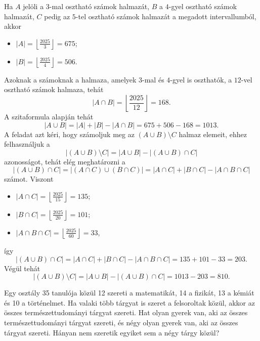 \begin{solution}
Ha $A$ jelöli a $3$-mal osztható számok halmazát, $B$ a $4$-gyel
osztható számok halmazát, $C$ pedig az $5$-tel osztható számok halmazát
a megadott intervallumból, akkor 
\begin{itemize}
\item $|A|=\left\lfloor \frac{2025}{3}\right\rfloor =675$; 
\item $|B|=\left\lfloor \frac{2025}{4}\right\rfloor =506$. 
\end{itemize}
Azoknak a számoknak a halmaza, amelyek $3$-mal és $4$-gyel is oszthatók,
a $12$-vel osztható számok halmaza, tehát 
\[
|A\cap B|=\left\lfloor \frac{2025}{12}\right\rfloor =168.
\]
A szitaformula alapján tehát 
\[
|A\cup B|=|A|+|B|-|A\cap B|=675+506-168=1013.
\]
A feladat azt kéri, hogy számoljuk meg az $(A\cup B)\setminus C$
halmaz elemeit, ehhez felhasználjuk a 
\[
|(A\cup B)\setminus C|=|A\cup B|-|(A\cup B)\cap C|
\]
azonosságot, tehát elég meghatározni a 
\[
|(A\cup B)\cap C|=|(A\cap C)\cup(B\cap C)|=|A\cap C|+|B\cap C|-|A\cap B\cap C|
\]
számot. Viszont 
\begin{itemize}
\item $|A\cap C|=\left\lfloor \frac{2025}{15}\right\rfloor =135$; 
\item $|B\cap C|=\left\lfloor \frac{2025}{20}\right\rfloor =101$; 
\item $|A\cap B\cap C|=\left\lfloor \frac{2025}{60}\right\rfloor =33$, 
\end{itemize}
így 
\[
|(A\cup B)\cap C|=|A\cap C|+|B\cap C|-|A\cap B\cap C|=135+101-33=203.
\]
Végül tehát 
\[
|(A\cup B)\setminus C|=|A\cup B|-|(A\cup B)\cap C|=1013-203=810.
\]
\end{solution}
\begin{extraproblem}
Egy osztály 35 tanulója közül 12 szereti a matematikát, 14 a fizikát,
13 a kémiát és 10 a történelmet. Ha valaki több tárgyat is szeret
a felsoroltak közül, akkor az összes természettudományi tárgyat szereti.
Hat olyan gyerek van, aki az összes természettudományi tárgyat szereti,
és négy olyan gyerek van, aki az összes tárgyat szereti. Hányan nem
szeretik egyiket sem a négy tárgy közül? 
\end{extraproblem}

